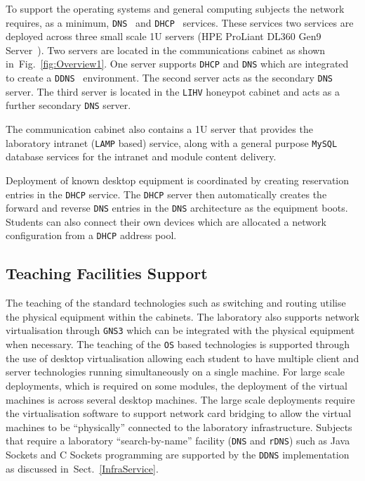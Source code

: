\documentclass{llncs}
\begin{document}
To support the operating systems and general computing subjects the network
requires, as a minimum, \texttt{DNS}~\cite{RA:11} and
\texttt{DHCP}~\cite{DL:02} services. These services two services are deployed
across three small scale 1U servers (HPE ProLiant DL360 Gen9
Server~\cite{HPE:17}). Two servers are located in the communications cabinet as
shown in~Fig.~\ref{fig:Overview1}. One server supports \texttt{DHCP} and
\texttt{DNS} which are integrated to create a \texttt{DDNS}~\cite{SV:06}
environment. The second server acts as the secondary \texttt{DNS} server. The
third server is located in the \texttt{LIHV} honeypot cabinet and acts as a
further secondary \texttt{DNS} server.

The communication cabinet also contains a 1U server that provides the
laboratory intranet (\texttt{LAMP} based) service, along with a general purpose
\texttt{MySQL} database services for the intranet and module content delivery.

Deployment of known desktop equipment is coordinated by creating reservation
entries in the \texttt{DHCP} service. The \texttt{DHCP} server then
automatically creates the forward and reverse \texttt{DNS} entries in the
\texttt{DNS} architecture as the equipment boots. Students can also connect
their own devices which are allocated a network configuration from a
\texttt{DHCP} address pool.

\subsection{Teaching Facilities Support}

The teaching of the standard technologies such as switching and routing utilise
the physical equipment within the cabinets. The laboratory also supports
network virtualisation through \texttt{GNS3} which can be integrated with the
physical equipment when necessary. The teaching of the \texttt{OS} based
technologies is supported through the use of desktop virtualisation allowing
each student to have multiple client and server technologies running
simultaneously on a single machine. For large scale deployments, which is
required on some modules, the deployment of the virtual machines is across
several desktop machines. The large scale deployments require the
virtualisation software to support network card bridging to allow the virtual
machines to be ``physically'' connected to the laboratory infrastructure.
Subjects that require a laboratory ``search-by-name'' facility (\texttt{DNS} and
\texttt{rDNS}) such as Java Sockets and C Sockets programming are supported by
the \texttt{DDNS} implementation as discussed in~Sect.~\ref{InfraService}.
\end{document}
